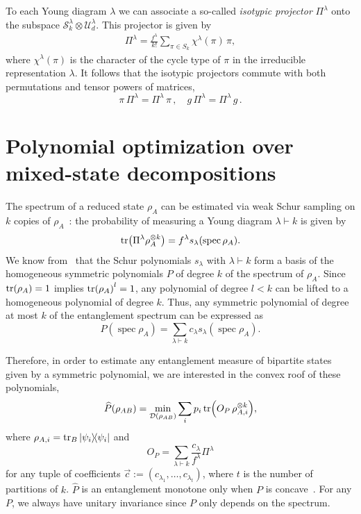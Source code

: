 \documentclass[aps,pra,twocolumn,showpacs,superscriptaddress,groupedaddress]{revtex4-2}
\DeclareMathOperator{\spec}{spec}
\newcommand{\ot}[0]{\otimes}
\begin{document}
To each Young diagram $\lambda$ we can associate a so-called {\em isotypic projector} $\Pi^\lambda$ onto the subspace $\mathcal{S}^\lambda_k \ot \mathcal{U}^\lambda_d$. This projector is given by
\begin{align}
    \Pi^\lambda = \frac{f^\lambda}{k!}\sum_{\pi \in S_k} \chi^\lambda(\pi)\, \pi,
\end{align}
where $\chi^\lambda(\pi)$ is the character of the cycle type of $\pi$ in the irreducible representation $\lambda$. It follows that the isotypic projectors commute with both permutations and tensor powers of matrices,
\begin{equation}
    \pi\,\Pi^\lambda = \Pi^\lambda\,\pi\,,\quad g\,\Pi^\lambda = \Pi^\lambda\,g\,.
\end{equation}

\section{Polynomial optimization over mixed-state decompositions}
The spectrum of a reduced state $\rho_A$ can be estimated via weak Schur sampling on $k$ copies of $\rho_A$~\cite{Keyl2001EstimatingSpectrum}: the probability of measuring a Young diagram $\lambda \vdash k$ is given by
\begin{equation}
    \tr(\Pi^\lambda \rho_A^{\otimes k}) = f^\lambda s_\lambda(\spec\rho_A).
\end{equation}
We know from~\cite{MacdonaldSymmFunc} that the Schur polynomials $s_\lambda$ with $\lambda \vdash k$ form a basis of the homogeneous symmetric polynomials $P$ of degree $k$ of the spectrum of $\rho_A$. Since $\tr(\rho_A) = 1$ implies $\tr(\rho_A)^{l} = 1$, any polynomial of degree $l < k$ can be lifted to a homogeneous polynomial of degree $k$. Thus, any symmetric polynomial of degree at most $k$ of the entanglement spectrum can be expressed as
\begin{equation}
    P(\spec\rho_A) = \sum_{\lambda\vdash k}c_\lambda s_\lambda(\spec\rho_A).
\end{equation}

Therefore, in order to estimate any entanglement measure of bipartite states given by a symmetric polynomial, we are interested in the convex roof of these polynomials,
\begin{equation}\label{eq:PrhoABcroof}
    \widehat{P}(\rho_{AB}) = \min_{\mathcal{D}(\rho_{AB})} \sum_i p_i \tr(O_P\, \rho_{A,i}^{\otimes k}),
\end{equation}
where $\rho_{A,i}=\tr_B\dyad{\psi_i}$ and
\begin{equation}\label{eq:OP}
    O_P = \sum_{\lambda \vdash k} \frac{c_\lambda}{f^\lambda} \Pi^\lambda
\end{equation}
for any tuple of coefficients $\vec{c}:=(c_{\lambda_1},\dots,c_{\lambda_t})$, where $t$ is the number of partitions of $k$. $\widehat{P}$ is an entanglement monotone only when $P$ is concave~\cite{Vidal_2000}. For any $P$, we always have unitary invariance since $P$ only depends on the spectrum.
\end{document}

